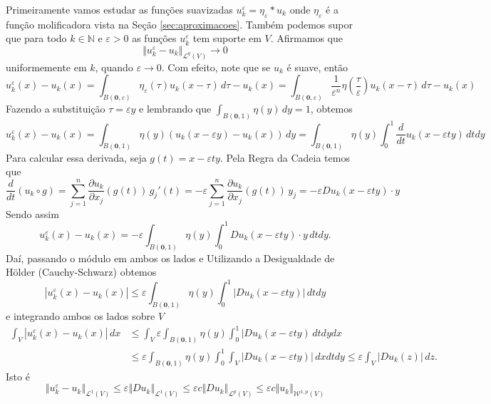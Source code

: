 \documentclass[a4paper, 11pt]{book}
\theoremstyle{definition}
\newcommand{\bN}{\mathbb{N}}
\newcommand{\bz}{\mathbf{0}}
\newcommand{\cL}{\mathcal{L}}
\newcommand{\cW}{\mathcal{W}}
\begin{document}
\begin{prf}
    Primeiramente vamos estudar as funções suavizadas $u_k^\varepsilon = \eta_\varepsilon * u_k$ onde $\eta_\varepsilon$ é a função molificadora vista na Seção \ref{sec:aproximacoes}. Também podemos supor que para todo $k \in \bN$ e $\varepsilon > 0$ as funções $u_k^\varepsilon$ tem suporte em $V$. Afirmamos que
    \begin{equation} \label{eq:convergenciaemlq}
        \Vert u^\varepsilon_k - u_k \Vert_{\cL^q(V)} \to 0
    \end{equation}
    uniformemente em $k$, quando $\varepsilon \to 0$.
    Com efeito, note que se $u_k$ é suave, então
    \[
        u_k^\varepsilon(x) - u_k(x) = \int_{B(\bz,\varepsilon)} \eta_\varepsilon(\tau) u_k (x - \tau) \,d\tau - u_k(x)  = \int_{B(\bz,\varepsilon)} \frac{1}{\varepsilon^n} \eta \left( \frac{\tau}{\varepsilon} \right) u_k (x - \tau) \,d\tau - u_k(x)
    \]
    Fazendo a substituição $\tau = \varepsilon y$ e lembrando que $\int_{B(\bz,1)} \eta(y) \,dy = 1$, obtemos
    \[
        u_k^\varepsilon(x) - u_k(x) = \int_{B(\bz,1)} \eta(y) \left( u_k(x - \varepsilon y) - u_k(x) \right) \,dy = \int_{B(\bz,1)} \eta(y) \int_0^1 \frac{d}{dt}u_k(x - \varepsilon t y) \,dt dy
    \]
    Para calcular essa derivada, seja $g(t) = x - \varepsilon t y$. Pela Regra da Cadeia temos que
    \[
        \frac{d}{dt} (u_k \circ g) = \sum_{j=1}^n \dfrac{\partial u_k}{\partial x_j} (g(t)) \, g_j'(t) = -\varepsilon\sum_{j=1}^{n} \dfrac{\partial u_k}{\partial x_j}(g(t)) \,y_j = -\varepsilon Du_k(x - \varepsilon ty) \cdot y
    \]
    Sendo assim
    \[
        u_k^\varepsilon(x) - u_k(x) = -\varepsilon \int_{B(\bz,1)} \eta(y) \int_0^1 Du_k(x - \varepsilon ty) \cdot y \,dtdy.
    \]
    Daí, passando o módulo em ambos os lados e Utilizando a Desigualdade de Hölder (Cauchy-Schwarz) obtemos
    \[
        |u_k^\varepsilon(x) - u_k(x)| \leqslant \varepsilon \int_{B(\bz,1)} \eta(y) \int_0^1 |Du_k(x - \varepsilon ty)| \,dtdy
    \]
    e integrando ambos os lados sobre $V$
    \[
        \begin{aligned}
            \int_{V} |u_k^\varepsilon(x) - u_k(x)|\,dx &\leqslant \int_{V} \varepsilon \int_{B(\bz,1)} \eta(y) \int_0^1 |Du_k(x - \varepsilon ty) \,dtdydx\\
            &\leqslant \varepsilon \int_{B(\bz,1)} \eta(y) \int_0^1 \int_{V} |Du_k(x - \varepsilon ty)| \,dxdtdy \leqslant \varepsilon \int_{V} |Du_k(z)| \,dz.
        \end{aligned}
    \]
    Isto é
    \[
        \Vert u_k^\varepsilon - u_k \Vert_{\cL^1(V)} \leqslant \varepsilon \Vert Du_k \Vert_{\cL^1(V)} \leqslant \varepsilon c \Vert Du_k \Vert_{\cL^p(V)} \leqslant \varepsilon c \Vert u_k \Vert_{\cW^{1,p}(V)}
\]
\end{prf}
\end{document}
